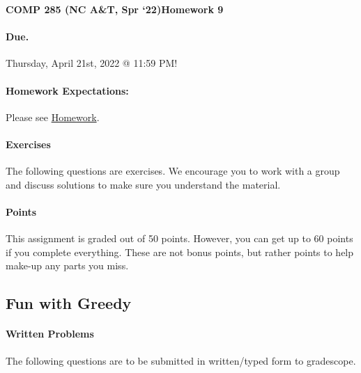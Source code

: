 \documentclass [12pt]{article}
\begin{document}
 

{\LARGE \textbf{COMP 285 (NC A\&T, Spr `22)}\hfill \textbf{Homework 9} } 
\vspace{1em} 
\begin{Instruction} 

\paragraph{Due.} Thursday, April 21st, 2022 @ 11:59 PM!
\end{Instruction} 

\vspace{1em} 
\begin{Instruction} \paragraph{Homework Expectations:} Please see \href{https://www.comp285-fall22.ml/homework/#general-homework-information}{Homework}.
\end{Instruction}

\vspace{1em} 
\begin{Instruction} 

\paragraph{Exercises} The following questions are exercises. We encourage you to work with a group and discuss solutions to make sure you understand the material.

\paragraph{Points} This assignment is graded out of 50 points. However, you can get up to 60 points if you complete everything. These are not bonus points, but rather points to help make-up any parts you miss.

\end{Instruction} 

\begin{centering}
\section*{Fun with Greedy}
\end{centering}

\begin{Instruction}

\paragraph{Written Problems} The following questions are to be submitted in written/typed form to gradescope.

\end{Instruction}
\end{document}
